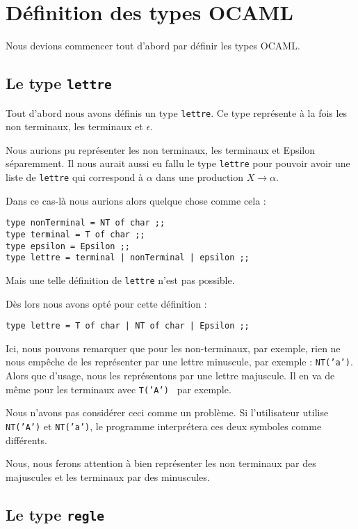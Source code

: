 \documentclass[11pt,a4paper]{article}
\def\code#1{\texttt{#1}} %
\begin{document}
\section{Définition des types OCAML}

Nous devions commencer tout d'abord par définir les types OCAML.
\newline

\subsection{Le type \code{lettre}}
Tout d'abord nous avons définis un type \code{lettre}. Ce type 
représente à la fois les non terminaux, les terminaux et $\epsilon$.

Nous aurions pu représenter les non terminaux, les terminaux et
Epsilon séparemment. Il nous aurait aussi eu fallu le type \code{lettre}
pour pouvoir avoir une liste de \code{lettre} qui correspond à $\alpha$
dans une production $X \rightarrow \alpha$.

Dans ce cas-là nous aurions alors quelque chose comme cela : 
\begin{verbatim}
type nonTerminal = NT of char ;;
type terminal = T of char ;;
type epsilon = Epsilon ;;
type lettre = terminal | nonTerminal | epsilon ;;
\end{verbatim}

Mais une telle définition de \code{lettre} n'est pas possible.

Dès lors nous avons opté pour cette définition : 
\begin{verbatim}
type lettre = T of char | NT of char | Epsilon ;;
\end{verbatim}

Ici, nous pouvons remarquer que pour les non-terminaux,
par exemple, rien ne nous empêche de les représenter par
une lettre minuscule, par exemple : \code{NT('a')}.
Alors que d'usage, 
nous les représentons par une lettre majuscule. 
Il en va de même pour les terminaux avec \code{T('A') } par
exemple.

Nous n'avons pas considérer ceci comme un problème. Si
l'utilisateur utilise \code{NT('A')} et \code{NT('a')}, le
programme interprétera ces deux symboles comme différents.

Nous, nous ferons attention à bien représenter les non terminaux
par des majuscules et les terminaux par des minuscules.

\subsection{Le type \code{regle}}
\end{document}
